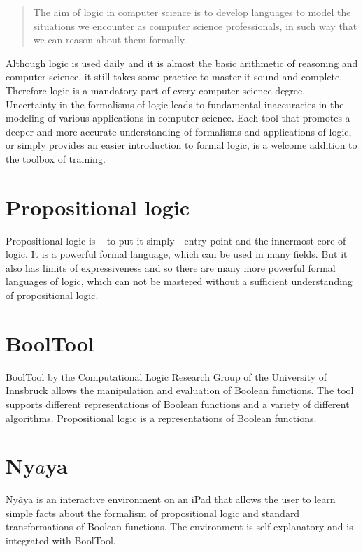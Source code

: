 
\begin{quote}
The aim of logic in computer science is to develop languages 
to model the situations we encounter as computer science professionals, 
in such way that we can reason about them formally. \cite{Huth:2004:LCS:975331}
\end{quote}

Although logic is used daily and it is almost the basic arithmetic of reasoning and computer science, 
it still takes some practice to master it sound and complete. 
Therefore logic is a mandatory part of every computer science degree. 
Uncertainty in the formalisms of logic leads to fundamental inaccuracies 
in the modeling of various applications in computer science. 
Each tool that promotes a deeper and more accurate understanding of formalisms and applications of logic,
or simply provides an easier introduction to formal logic, 
is a welcome addition to the toolbox of training.

\section{Propositional logic}

Propositional logic is – to put it simply - entry point and the innermost core of logic. 
It is a powerful formal language, which can be used in many fields. 
But it also has limits of expressiveness and so 
there are many more powerful formal languages of logic, 
which can not be mastered without a sufficient understanding  of propositional logic.

\section{BoolTool}

BoolTool by the Computational Logic Research Group of the University of Innsbruck allows the manipulation and evaluation of Boolean functions. The tool supports different representations of Boolean functions and a variety of different algorithms.
Propositional logic is a representations of Boolean functions.

\section{Ny$\bar{a}$ya}

Ny$\bar{a}$ya is an interactive environment on an iPad that allows the user to learn simple facts about the formalism of propositional logic and standard transformations of Boolean functions. The environment is self-explanatory and is integrated with BoolTool. 


%
